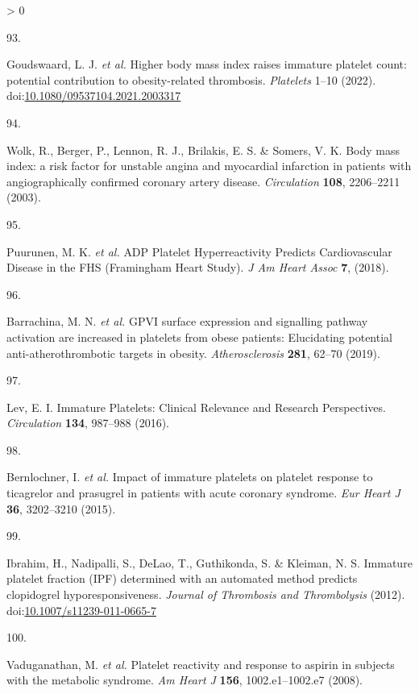 \documentclass[11pt,twoside]{bristolthesis}
\newlength{\cslhangindent}
\newlength{\csllabelwidth}
\newenvironment{CSLReferences}[2] %
 {%
  \setlength{\parindent}{0pt}
  \ifodd #1 \everypar{\setlength{\hangindent}{\cslhangindent}}\ignorespaces\fi
  \ifnum #2 > 0
  \setlength{\parskip}{#2\baselineskip}
  \fi
 }%
 {}
\newcommand{\CSLLeftMargin}[1]{\parbox[t]{\csllabelwidth}{#1}}
\newcommand{\CSLRightInline}[1]{\parbox[t]{\linewidth - \csllabelwidth}{#1}\break}
\begin{document}
\begin{CSLReferences}{0}{0}
\leavevmode\hypertarget{ref-Goudswaard2022}{}%
\CSLLeftMargin{93. }
\CSLRightInline{Goudswaard, L. J. \emph{et al.} {Higher body mass index raises immature platelet count: potential contribution to obesity-related thrombosis}. \emph{Platelets} 1--10 (2022). doi:\href{https://doi.org/10.1080/09537104.2021.2003317}{10.1080/09537104.2021.2003317}}

\leavevmode\hypertarget{ref-Wolk2003a}{}%
\CSLLeftMargin{94. }
\CSLRightInline{Wolk, R., Berger, P., Lennon, R. J., Brilakis, E. S. \& Somers, V. K. {Body mass index: a risk factor for unstable angina and myocardial infarction in patients with angiographically confirmed coronary artery disease}. \emph{Circulation} \textbf{108}, 2206--2211 (2003).}

\leavevmode\hypertarget{ref-Puurunen2018}{}%
\CSLLeftMargin{95. }
\CSLRightInline{Puurunen, M. K. \emph{et al.} {ADP Platelet Hyperreactivity Predicts Cardiovascular Disease in the FHS (Framingham Heart Study)}. \emph{J Am Heart Assoc} \textbf{7}, (2018).}

\leavevmode\hypertarget{ref-Barrachina2019}{}%
\CSLLeftMargin{96. }
\CSLRightInline{Barrachina, M. N. \emph{et al.} {GPVI surface expression and signalling pathway activation are increased in platelets from obese patients: Elucidating potential anti-atherothrombotic targets in obesity}. \emph{Atherosclerosis} \textbf{281}, 62--70 (2019).}

\leavevmode\hypertarget{ref-Lev2016a}{}%
\CSLLeftMargin{97. }
\CSLRightInline{Lev, E. I. {Immature Platelets: Clinical Relevance and Research Perspectives}. \emph{Circulation} \textbf{134}, 987--988 (2016).}

\leavevmode\hypertarget{ref-Bernlochner2015a}{}%
\CSLLeftMargin{98. }
\CSLRightInline{Bernlochner, I. \emph{et al.} {Impact of immature platelets on platelet response to ticagrelor and prasugrel in patients with acute coronary syndrome}. \emph{Eur Heart J} \textbf{36}, 3202--3210 (2015).}

\leavevmode\hypertarget{ref-Ibrahim2012}{}%
\CSLLeftMargin{99. }
\CSLRightInline{Ibrahim, H., Nadipalli, S., DeLao, T., Guthikonda, S. \& Kleiman, N. S. {Immature platelet fraction (IPF) determined with an automated method predicts clopidogrel hyporesponsiveness}. \emph{Journal of Thrombosis and Thrombolysis} (2012). doi:\href{https://doi.org/10.1007/s11239-011-0665-7}{10.1007/s11239-011-0665-7}}

\leavevmode\hypertarget{ref-Vaduganathan2008a}{}%
\CSLLeftMargin{100. }
\CSLRightInline{Vaduganathan, M. \emph{et al.} {Platelet reactivity and response to aspirin in subjects with the metabolic syndrome}. \emph{Am Heart J} \textbf{156}, 1002.e1--1002.e7 (2008).}


\end{CSLReferences}
\end{document}
